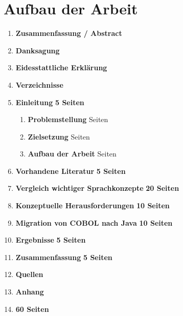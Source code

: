 \section{Aufbau der Arbeit}

\begin{framed}
\begin{enumerate}[label=\arabic*.]
    \item[] \textbf{Zusammenfassung / Abstract}

    \item[] \textbf{Danksagung}

    \item[] \textbf{Eidesstattliche Erklärung}

    \item[] \textbf{Verzeichnisse}

    \item   \textbf{Einleitung}                                         \dotfill \textbf{5 Seiten}
        \begin{enumerate}[label=\arabic*.]
            \item \textbf{Problemstellung}                               Seiten
            \item \textbf{Zielsetzung}                                   Seiten
            \item \textbf{Aufbau der Arbeit}                             Seiten
        \end{enumerate}

    \item   \textbf{Vorhandene Literatur}                               \dotfill \textbf{5 Seiten}
    
    \item   \textbf{Vergleich wichtiger Sprachkonzepte}                 \dotfill \textbf{20 Seiten}
    
    \item   \textbf{Konzeptuelle Herausforderungen}                     \dotfill \textbf{10 Seiten}

    \item   \textbf{Migration von COBOL nach Java}                      \dotfill \textbf{10 Seiten}
    
    \item   \textbf{Ergebnisse}                                         \dotfill \textbf{5 Seiten}
    
    \item   \textbf{Zusammenfassung}                                    \dotfill \textbf{5 Seiten}
    
    \item[] \textbf{Quellen}
    
    \item[] \textbf{Anhang}
    
    \item[]                                                             \hfill \textbf{60 Seiten}
\end{enumerate}
\end{framed}